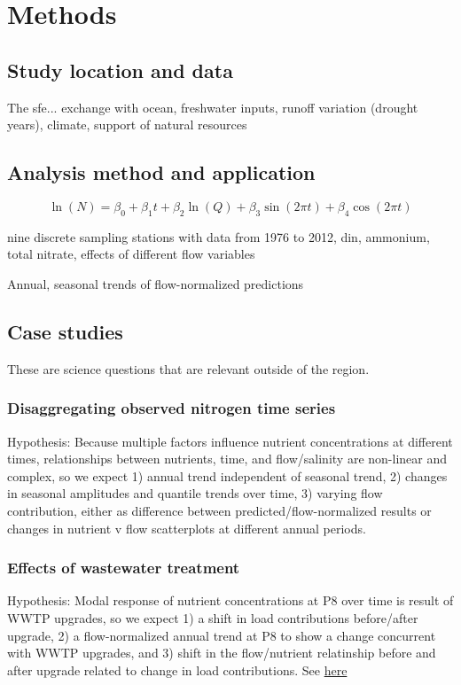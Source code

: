 \documentclass[letterpaper,12pt,oneside]{article}\usepackage[]{graphicx}\usepackage[]{color}
\begin{document}
\section{Methods}

\subsection{Study location and data}

The \ac{sfe}... exchange with ocean, freshwater inputs, runoff variation (drought years), climate, support of natural resources
\subsection{Analysis method and application}

\begin{equation}
\ln\left(N\right) = \beta_0 + \beta_1 t + \beta_2 \ln\left(Q\right) + \beta_3 \sin\left(2\pi t\right) + \beta_4 \cos\left(2\pi t\right)
\end{equation}

nine discrete sampling stations with data from 1976 to 2012, \ac{din}, ammonium, total nitrate, effects of different flow variables

Annual, seasonal trends of flow-normalized predictions

\subsection{Case studies}
These are science questions that are relevant outside of the region.
\subsubsection{Disaggregating observed nitrogen time series}
Hypothesis: Because multiple factors influence nutrient concentrations at different times, relationships between nutrients, time, and flow/salinity are non-linear and complex, so we expect 1) annual trend independent of seasonal trend, 2) changes in seasonal amplitudes and quantile trends over time, 3) varying flow contribution, either as difference between predicted/flow-normalized results or changes in nutrient v flow scatterplots at different annual periods.
\subsubsection{Effects of wastewater treatment}
Hypothesis: Modal response of nutrient concentrations at P8 over time is result of WWTP upgrades, so we expect 1) a shift in load contributions before/after upgrade, 2) a flow-normalized annual trend at P8 to show a change concurrent with WWTP upgrades, and 3) shift in the flow/nutrient relatinship before and after upgrade related to change in load contributions. See \href{http://www.waterboards.ca.gov/centralvalley/board_decisions/adopted_orders/san_joaquin/r5-2008-0086_res.pdf}{here}
\end{document}
